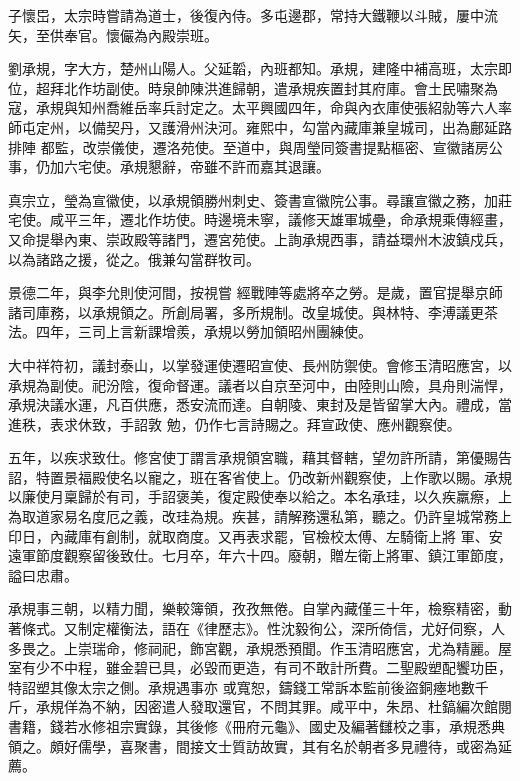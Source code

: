 \begin{pinyinscope}
 子懷岊，太宗時嘗請為道士，後復內侍。多屯邊郡，常持大鐵鞭以斗賊，屢中流矢，至供奉官。懷儼為內殿崇班。



 劉承規，字大方，楚州山陽人。父延韜，內班都知。承規，建隆中補高班，太宗即位，超拜北作坊副使。時泉帥陳洪進歸朝，遣承規疾置封其府庫。會土民嘯聚為寇，承規與知州喬維岳率兵討定之。太平興國四年，命與內衣庫使張紹勍等六人率師屯定州，以備契丹，又護滑州決河。雍熙中，勾當內藏庫兼皇城司，出為鄜延路排陣
 都監，改崇儀使，遷洛苑使。至道中，與周瑩同簽書提點樞密、宣徽諸房公事，仍加六宅使。承規懇辭，帝雖不許而嘉其退讓。



 真宗立，瑩為宣徽使，以承規領勝州刺史、簽書宣徽院公事。尋讓宣徽之務，加莊宅使。咸平三年，遷北作坊使。時邊境未寧，議修天雄軍城壘，命承規乘傳經畫，又命提舉內東、崇政殿等諸門，遷宮苑使。上詢承規西事，請益環州木波鎮戍兵，以為諸路之援，從之。俄兼勾當群牧司。



 景德二年，與李允則使河間，按視嘗
 經戰陣等處將卒之勞。是歲，置官提舉京師諸司庫務，以承規領之。所創局署，多所規制。改皇城使。與林特、李溥議更茶法。四年，三司上言新課增羨，承規以勞加領昭州團練使。



 大中祥符初，議封泰山，以掌發運使遷昭宣使、長州防禦使。會修玉清昭應宮，以承規為副使。祀汾陰，復命督運。議者以自京至河中，由陸則山險，具舟則湍悍，承規決議水運，凡百供應，悉安流而達。自朝陵、東封及是皆留掌大內。禮成，當進秩，表求休致，手詔敦
 勉，仍作七言詩賜之。拜宣政使、應州觀察使。



 五年，以疾求致仕。修宮使丁謂言承規領宮職，藉其督轄，望勿許所請，第優賜告詔，特置景福殿使名以寵之，班在客省使上。仍改新州觀察使，上作歌以賜。承規以廉使月稟歸於有司，手詔褒美，復定殿使奉以給之。本名承珪，以久疾羸瘵，上為取道家易名度厄之義，改珪為規。疾甚，請解務還私第，聽之。仍許皇城常務上印日，內藏庫有創制，就取商度。又再表求罷，官檢校太傅、左騎衛上將
 軍、安遠軍節度觀察留後致仕。七月卒，年六十四。廢朝，贈左衛上將軍、鎮江軍節度，謚曰忠肅。



 承規事三朝，以精力聞，樂較簿領，孜孜無倦。自掌內藏僅三十年，檢察精密，動著條式。又制定權衡法，語在《律歷志》。性沈毅徇公，深所倚信，尤好伺察，人多畏之。上崇瑞命，修祠祀，飾宮觀，承規悉預聞。作玉清昭應宮，尤為精麗。屋室有少不中程，雖金碧已具，必毀而更造，有司不敢計所費。二聖殿塑配饗功臣，特詔塑其像太宗之側。承規遇事亦
 或寬恕，鑄錢工常訴本監前後盜銅瘞地數千斤，承規佯為不納，因密遣人發取還官，不問其罪。咸平中，朱昂、杜鎬編次館閱書籍，錢若水修祖宗實錄，其後修《冊府元龜》、國史及編著讎校之事，承規悉典領之。頗好儒學，喜聚書，間接文士質訪故實，其有名於朝者多見禮待，或密為延薦。




\end{pinyinscope}
